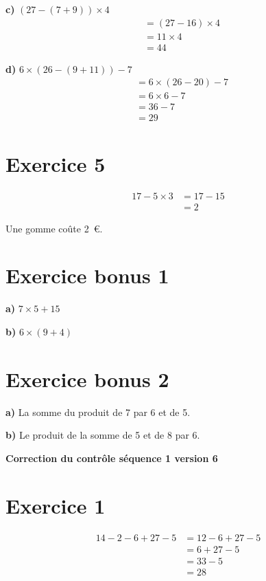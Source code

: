 \documentclass[12pt]{extarticle}
\begin{document}
\textbf{c)} $(27 - (7 + 9)) \times 4$
\begin{align*}
&= (27 - 16) \times 4 \\
&= 11 \times 4 \\
&= 44
\end{align*}

\textbf{d)} $6 \times (26 - (9 + 11)) - 7$
\begin{align*}
&= 6 \times (26 - 20) - 7 \\
&= 6 \times 6 - 7 \\
&= 36 - 7 \\
&= 29
\end{align*}

\section*{Exercice 5}
\begin{align*}
17 - 5 \times 3 &= 17 - 15 \\
                &= 2
\end{align*}

Une gomme coûte 2~€.

\section*{Exercice bonus 1}

\textbf{a)} $7 \times 5 + 15$

\textbf{b)} $6 \times (9 + 4)$

\section*{Exercice bonus 2}

\textbf{a)} La somme du produit de 7 par 6 et de 5.

\textbf{b)} Le produit de la somme de 5 et de 8 par 6.

\newpage

\begin{center}
\Large\textbf{Correction du contrôle séquence 1 version 6}
\end{center}

\section*{Exercice 1}
\begin{align*}
14 - 2 - 6 + 27 - 5 &= 12 - 6 + 27 - 5 \\
                     &= 6 + 27 - 5 \\
                     &= 33 - 5 \\
                     &= 28
\end{align*}
\end{document}

